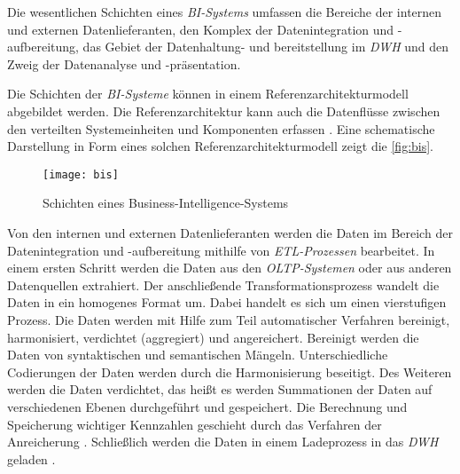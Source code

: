 Die wesentlichen Schichten eines \textit{\acrshort{BI}-Systems} umfassen die Bereiche der internen und externen Datenlieferanten, den Komplex der Datenintegration und -aufbereitung, 
das Gebiet der Datenhaltung- und bereitstellung im \textit{\acrlong{DWH}} und den Zweig der Datenanalyse und -präsentation\cites[vgl.][126 ff.]{linden_geschaftsmodellbasierte_2016}[vgl.][8]{kemper_business_2010}. 

Die Schichten der \textit{\acrshort{BI}-Systeme} können in einem Referenzarchitekturmodell abgebildet werden. 
Die Referenzarchitektur kann auch die Datenflüsse zwischen den verteilten Systemeinheiten und Komponenten erfassen \cite[vgl.][126 ff.]{linden_geschaftsmodellbasierte_2016}.
Eine schematische Darstellung in Form eines solchen Referenzarchitekturmodell zeigt die \autoref{fig:bis}.

\begin{figure}[h]
    \centering
        \texttt{[image: bis]}
        \caption{Schichten eines Business-Intelligence-Systems}
        \label{fig:bis}
\end{figure}

Von den internen und externen Datenlieferanten werden die Daten im Bereich der Datenintegration und -aufbereitung mithilfe von \textit{\acrshort{ETL}-Prozessen} bearbeitet. 
In einem ersten Schritt werden die Daten aus den \textit{\acrshort{OLTP}-Systemen} oder aus anderen Datenquellen extrahiert. 
Der anschließende Transformationsprozess wandelt die Daten in ein homogenes Format um. Dabei handelt es sich um einen vierstufigen Prozess. Die Daten werden mit Hilfe 
zum Teil automatischer Verfahren bereinigt, harmonisiert, verdichtet (aggregiert) und angereichert.
Bereinigt werden die Daten von syntaktischen und semantischen Mängeln. Unterschiedliche Codierungen der Daten werden durch die Harmonisierung 
beseitigt. Des Weiteren werden die Daten verdichtet, das heißt es werden Summationen der Daten auf verschiedenen Ebenen durchgeführt und gespeichert. 
Die Berechnung und Speicherung wichtiger Kennzahlen geschieht durch das Verfahren der Anreicherung \cites[vgl.][86]{gronwald_integrierte_2020}[vgl.][277 f.]{abts_grundkurs_2017}.
Schließlich werden die Daten in einem Ladeprozess in das \textit{\acrlong{DWH}} geladen \cite[vgl.][129 ff.]{linden_geschaftsmodellbasierte_2016}. 

